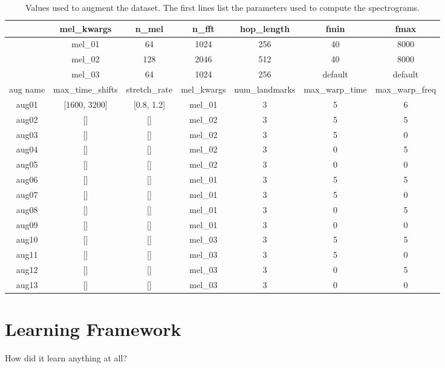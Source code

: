 \begin{table*}[t!]
    \centering
    \caption{Values used to augment the dataset. The first lines list the parameters used to compute the spectrograms.}
    \label{tab:aug_values}
    \begin{tabular}{|c|cccccc|}
        \hline
        & mel\_kwargs & n\_mel & n\_fft & hop\_length & fmin & fmax \\
        \hline
        & mel\_01 & 64 & 1024 & 256 & 40 & 8000  \\
        & mel\_02 & 128 & 2046 & 512 & 40 & 8000  \\
        & mel\_03 & 64 & 1024 & 256 & default & default  \\
        \hline
        \hline
        aug name & max\_time\_shifts & stretch\_rate & mel\_kwargs & num\_landmarks & max\_warp\_time & max\_warp\_freq\\
        \hline
        aug01 &  [1600, 3200] & [0.8, 1.2] & mel\_01 & 3 & 5 & 6 \\
        aug02 &  [] & [] & mel\_02 & 3 & 5 & 5 \\
        aug03 &  [] & [] & mel\_02 & 3 & 5 & 0 \\
        aug04 &  [] & [] & mel\_02 & 3 & 0 & 5 \\
        aug05 &  [] & [] & mel\_02 & 3 & 0 & 0 \\
        aug06 &  [] & [] & mel\_01 & 3 & 5 & 5 \\
        aug07 &  [] & [] & mel\_01 & 3 & 5 & 0 \\
        aug08 &  [] & [] & mel\_01 & 3 & 0 & 5 \\
        aug09 &  [] & [] & mel\_01 & 3 & 0 & 0 \\
        aug10 &  [] & [] & mel\_03 & 3 & 5 & 5 \\
        aug11 &  [] & [] & mel\_03 & 3 & 5 & 0 \\
        aug12 &  [] & [] & mel\_03 & 3 & 0 & 5 \\
        aug13 &  [] & [] & mel\_03 & 3 & 0 & 0 \\
        \hline
    \end{tabular}
\end{table*}

\section{Learning Framework}
\label{sec:learning_framework}

How did it learn anything at all?


